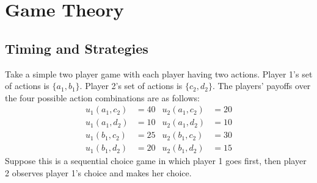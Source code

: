 \section{Game Theory}
\subsection{Timing and Strategies}

\noindent Take a simple two player game with each player having two actions. Player 1's set of actions is $\{a_1,b_1\}$. Player 2's set of actions is $\{c_2,d_2\}$. The players' payoffs over the four possible action combinations are as follows:
\begin{align*}
u_1(a_1,c_2) &= 40 & u_2(a_1,c_2) &= 20\\
u_1(a_1,d_2) &= 10 & u_2(a_1,d_2) &= 10\\
u_1(b_1,c_2) &= 25 & u_2(b_1,c_2) &= 30\\
u_1(b_1,d_2) &= 20 & u_2(b_1,d_2) &= 15
\end{align*}
Suppose this is a sequential choice game in which player 1 goes first, then player 2 observes player 1's choice and makes her choice.

